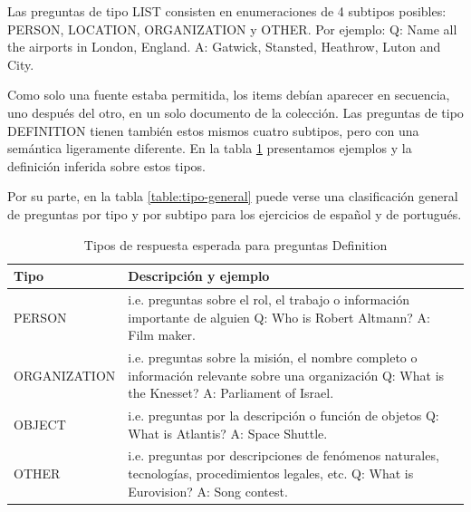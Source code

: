 Las preguntas de tipo LIST consisten en enumeraciones de 4 subtipos posibles: PERSON, LOCATION, ORGANIZATION y OTHER.
Por ejemplo:\newline
Q: Name all the airports in London, England. \newline
A: Gatwick, Stansted, Heathrow, Luton and City.

Como solo una fuente estaba permitida, los items debían aparecer en secuencia, uno después del otro, en un solo documento de la colección.
Las preguntas de tipo DEFINITION tienen también estos mismos cuatro subtipos, pero con una semántica ligeramente diferente. En la tabla \ref{table:definition-questions} presentamos ejemplos y la definición inferida sobre estos tipos.

Por su parte, en la tabla \ref{table:tipo-general} puede verse una clasificación general de preguntas por tipo y por subtipo para los ejercicios de español y de portugués.

\begin{center}
\begin{table}
\centering
\begin{tabular}{| l | p{12cm}|}
\hline
Tipo & Descripción y ejemplo \\ \hline
PERSON & i.e. preguntas sobre el rol, el trabajo o información importante de alguien \newline
 Q: Who is Robert Altmann? \newline
 A: Film maker. \\ \hline
ORGANIZATION & i.e. preguntas sobre la misión, el nombre completo o información relevante sobre una organización \newline
 Q: What is the Knesset? \newline
 A: Parliament of Israel. \\ \hline
OBJECT & i.e. preguntas por la descripción o función de objetos \newline
Q: What is Atlantis? \newline
A: Space Shuttle. \\ \hline
OTHER & i.e. preguntas por descripciones de fenómenos naturales, tecnologías, procedimientos legales, etc. \newline
Q: What is Eurovision? \newline
A: Song contest. \\ \hline
\end{tabular}
\caption{Tipos de respuesta esperada para preguntas Definition}
\label{table:definition-questions}
\end{table}
\end{center}


